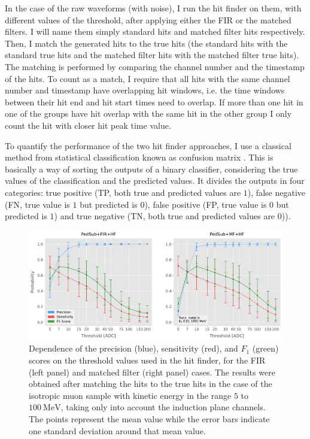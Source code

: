 In the case of the raw waveforms (with noise), I run the hit finder on them, with different values of the threshold, after applying either the FIR or the matched filters. I will name them simply standard hits and matched filter hits respectively. Then, I match the generated hits to the true hits (the standard hits with the standard true hits and the matched filter hits with the matched filter true hits). The matching is performed by comparing the channel number and the timestamp of the hits. To count as a match, I require that all hits with the same channel number and timestamp have overlapping hit windows, i.e. the time windows between their hit end and hit start times need to overlap. If more than one hit in one of the groups have hit overlap with the same hit in the other group I only count the hit with closer hit peak time value.

To quantify the performance of the two hit finder approaches, I use a classical method from statistical classification known as confusion matrix \cite{Stehman1997}. This is basically a way of sorting the outputs of a binary classifier, considering the true values of the classification and the predicted values. It divides the outputs in four categories: true positive (TP, both true and predicted values are $1$), false negative (FN, true value is $1$ but predicted is $0$), false positive (FP, true value is $0$ but predicted is $1$) and true negative (TN, both true and predicted values are $0$)).

\begin{figure}[t]
	\centering
	\includegraphics[width=.99\linewidth]{Images/Matched_Filter/hit_study_muon_scores_indct}
	\caption[Dependence of the precision, sensitivity, and $F_{1}$ scores on the threshold values used in the hit finder for the FIR and matched filters.]{Dependence of the precision (blue), sensitivity (red), and $F_{1}$ (green) scores on the threshold values used in the hit finder, for the FIR (left panel) and matched filter (right panel) cases. The results were obtained after matching the hits to the true hits in the case of the isotropic muon sample with kinetic energy in the range $5$ to $100 \ \mathrm{MeV}$, taking only into account the induction plane channels. The points represent the mean value while the error bars indicate one standard deviation around that mean value.}
	\label{fig:threshold_opt}
\end{figure}

